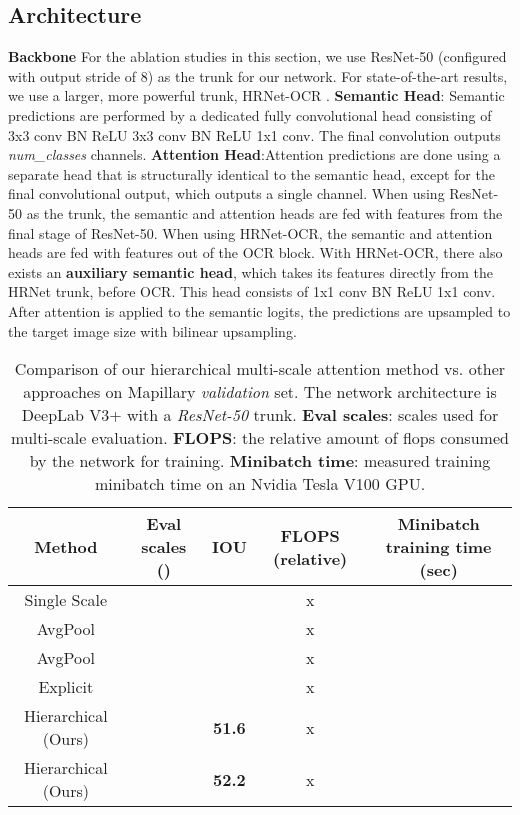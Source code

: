 \documentclass{article}
\begin{document}
 \subsection{Architecture}
 \textbf{Backbone} For the ablation studies in this section, we use ResNet-50 \cite{he2016deep} (configured with output stride of 8) as the trunk for our network. For state-of-the-art results, we use a larger, more powerful trunk, HRNet-OCR \cite{yuan2019objectcontextual}. \textbf{Semantic Head}: Semantic predictions are performed by a dedicated fully convolutional head consisting of 3x3 conv  BN  ReLU   3x3 conv  BN  ReLU  1x1 conv. The final convolution outputs \textit{num\_classes} channels. \textbf{Attention Head}:Attention predictions are done using a separate head that is structurally identical to the semantic head, except for the final convolutional output, which outputs a single channel. When using ResNet-50 as the trunk, the semantic and attention heads are fed with features from the final stage of ResNet-50. When using HRNet-OCR, the semantic and attention heads are fed with features out of the OCR block. With HRNet-OCR, there also exists an \textbf{auxiliary semantic head}, which takes its features directly from the HRNet trunk, before OCR. This head consists of 1x1 conv  BN  ReLU  1x1 conv. After attention is applied to the semantic logits, the predictions are upsampled to the target image size with bilinear upsampling.
 
 
 
\begin{table}[htb!]
\centering
\begin{tabular}{|c|c|c|c|c|}
\hline
\textbf{Method}     & \textbf{Eval scales ()} & \textbf{IOU} & \textbf{FLOPS (relative)} & \textbf{Minibatch training time (sec)}\\ \hline
Single Scale      &          &            & x  &  \\ \hline
AvgPool      &          &            & x  &  \\ \hline
AvgPool      &      &            & x  &  \\ \hline
Explicit   &           &            & x  &  \\ \hline
Hierarchical (Ours)         &           & \textbf{51.6}  & x &  \\ \hline
Hierarchical (Ours)         &      & \textbf{52.2}  & x  & \\ \hline
\end{tabular}

\caption{Comparison of our hierarchical multi-scale attention method vs. other approaches on Mapillary \textit{validation} set. The network architecture is DeepLab V3+ with a \textit{ResNet-50} trunk. \textbf{Eval scales}: scales used for multi-scale evaluation. \textbf{FLOPS}: the relative amount of flops consumed by the network for training. \textbf{Minibatch time}: measured training minibatch time on an Nvidia Tesla V100 GPU.}
\end{table}
\end{document}
